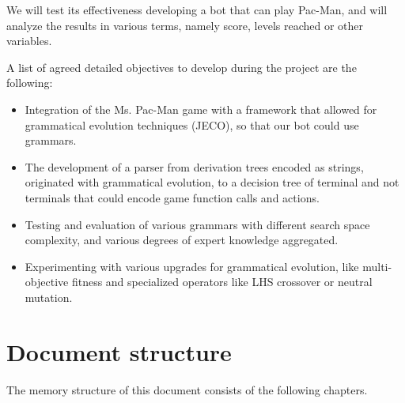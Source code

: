 We will test its effectiveness developing a bot that can play Pac-Man, and will analyze the results in various terms, namely score, levels reached or other variables.
 
A list of agreed detailed objectives to develop during the project are the following:
\begin{itemize}
\item Integration of the Ms. Pac-Man game with a framework that allowed for grammatical evolution techniques (JECO), so that our bot could use grammars.

\item The development of a parser from derivation trees encoded as strings, originated with grammatical evolution, to a decision tree of terminal and not terminals that could encode game function calls and actions.

\item Testing and evaluation of various grammars with different search space complexity, and various degrees of expert knowledge aggregated.

\item Experimenting with various upgrades for grammatical evolution, like multi-objective fitness and specialized operators like LHS crossover or neutral mutation. 
\end{itemize}

\section{Document structure}
The memory structure of this document consists of the following chapters.

